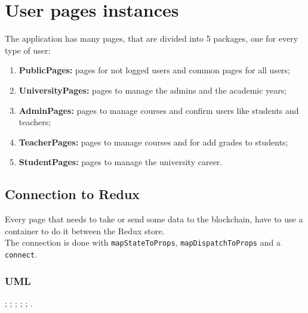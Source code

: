\documentclass[../react.tex]{subfiles}
\begin{document}
	
	\section{User pages instances}
	The application has many pages, that are divided into 5 packages, one for every type of user:
	\begin{enumerate}
		\item \textbf{PublicPages: } pages for not logged users and common pages for all users;
		\item \textbf{UniversityPages: } pages to manage the admins and the academic years;
		\item \textbf{AdminPages: } pages to manage courses and confirm users like students and teachers;
		\item \textbf{TeacherPages: } pages to manage courses and for add grades to students;
		\item \textbf{StudentPages: } pages to manage the university career.
	\end{enumerate}

	\subsection{Connection to Redux}
	Every page that needs to take or send some data to the blockchain, have to use a container to do it between the Redux store.\\
	The connection is done with \texttt{mapStateToProps}, \texttt{mapDispatchToProps} and a \texttt{connect}.\\

	\subsubsection{UML}
	;
	;
	;
	;
	;
	.
\end{document}

